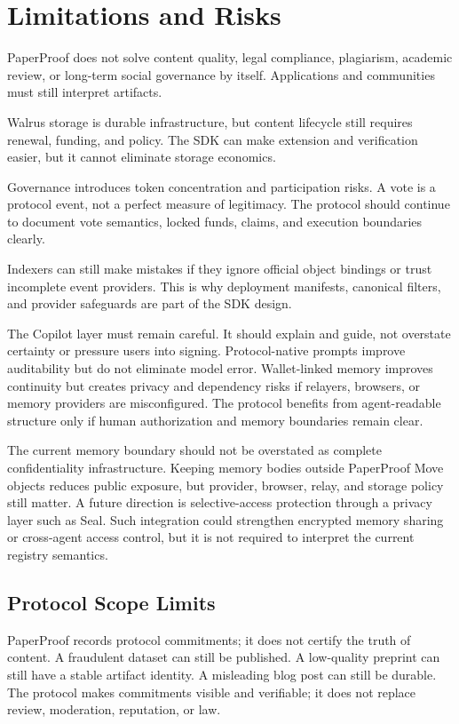 \documentclass[journal]{IEEEtran}
\begin{document}
\section{Limitations and Risks}

PaperProof does not solve content quality, legal compliance, plagiarism, academic review, or long-term social governance by itself. Applications and communities must still interpret artifacts.

Walrus storage is durable infrastructure, but content lifecycle still requires renewal, funding, and policy. The SDK can make extension and verification easier, but it cannot eliminate storage economics.

Governance introduces token concentration and participation risks. A vote is a protocol event, not a perfect measure of legitimacy. The protocol should continue to document vote semantics, locked funds, claims, and execution boundaries clearly.

Indexers can still make mistakes if they ignore official object bindings or trust incomplete event providers. This is why deployment manifests, canonical filters, and provider safeguards are part of the SDK design.

The Copilot layer must remain careful. It should explain and guide, not overstate certainty or pressure users into signing. Protocol-native prompts improve auditability but do not eliminate model error. Wallet-linked memory improves continuity but creates privacy and dependency risks if relayers, browsers, or memory providers are misconfigured. The protocol benefits from agent-readable structure only if human authorization and memory boundaries remain clear.

The current memory boundary should not be overstated as complete confidentiality
infrastructure. Keeping memory bodies outside PaperProof Move objects reduces
public exposure, but provider, browser, relay, and storage policy still matter.
A future direction is selective-access protection through a privacy layer such
as Seal. Such integration could strengthen encrypted memory sharing or
cross-agent access control, but it is not required to interpret the current
registry semantics.

\subsection{Protocol Scope Limits}

PaperProof records protocol commitments; it does not certify the truth of content. A fraudulent dataset can still be published. A low-quality preprint can still have a stable artifact identity. A misleading blog post can still be durable. The protocol makes commitments visible and verifiable; it does not replace review, moderation, reputation, or law.
\end{document}
